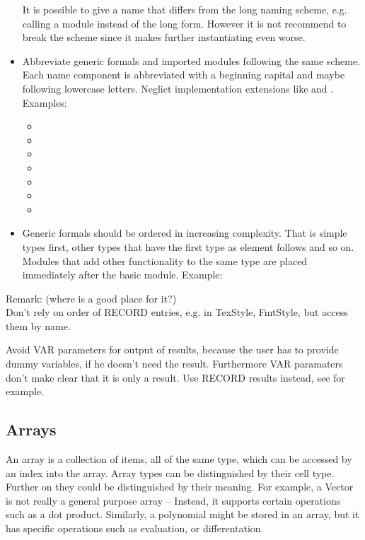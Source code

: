 \begin{itemize}
It is possible to give a name that differs from
the long naming scheme,
e.g. calling a module 
instead of the long form.
However it is not recommend to break the scheme
since it makes further instantiating even worse.
\item Abbreviate generic formals and imported modules following the same scheme.
Each name component is abbreviated with a beginning capital and
maybe following lowercase letters.
Neglict implementation extensions like  and .
Examples:
\begin{itemize}
\item {}
\item {}
\item {}
\item {}
\item {}
\item {}
\item {}
\end{itemize}
\item Generic formals should be ordered in increasing complexity.
That is simple types first,
other types that have the first type as element follows and so on.
Modules that add other functionality to the same type
are placed immediately after the basic module.
Example:
\end{itemize}

Remark: (where is a good place for it?)\\
Don't rely on order of RECORD entries,
e.g. in TexStyle, FmtStyle,
but access them by name.

Avoid VAR parameters for output of results,
because the user has to provide dummy variables,
if he doesn't need the result.
Furthermore VAR paramaters don't make clear
that it is only a result.
Use RECORD results instead,
see  for example.

\subsection{Arrays}
An array is a collection of items, all of the same type,
which can be accessed by an index into the array.
Array types can be distinguished by their cell type.
Further on they could be distinguished by their meaning.
For example, a Vector is not really a general purpose array --
Instead, it supports certain operations such as a dot product.
Similarly, a polynomial might be stored in an array,
but it has specific operations such as evaluation,
or differentation.

